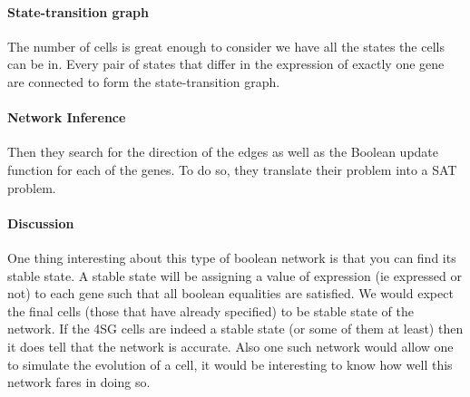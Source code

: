 \documentclass[a4paper,12pt]{book}
\theoremstyle{break}
\begin{document}
\paragraph{State-transition graph} 
The number of cells is great enough to consider we have all the states the cells can be in. Every pair of states that differ in the expression of exactly one gene are connected to form the state-transition graph.
\paragraph{Network Inference}
Then they search for the direction of the edges as well as the Boolean update function for each of the genes. To do so, they translate their problem into a SAT problem.


\paragraph{Discussion} One thing interesting about this type of boolean network is that you can find its stable state. A stable state will be assigning a value of expression (ie expressed or not) to each gene such that all boolean equalities are satisfied. We would expect the final cells (those that have already specified) to be stable state of the network. If the 4SG cells are indeed a stable state (or some of them at least) then it does tell that the network is accurate. Also one such network would allow one to simulate the evolution of a cell, it would be interesting to know how well this network fares in doing so.



	
\end{document}
